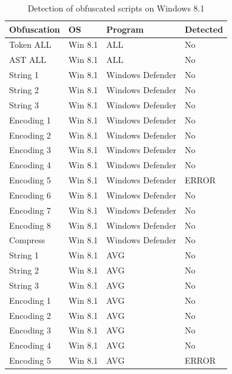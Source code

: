 \documentclass{article}%
\begin{document}
\begin{table}[]
\caption {Detection of obfuscated scripts on Windows 8.1} \label{tab:table_two}
\begin{center}
\begin{tabular}{|l|l|l|l|}
\hline
Obfuscation & OS      & Program          & Detected \\ \hline
Token ALL   & Win 8.1 & ALL              & No       \\ \hline
AST ALL     & Win 8.1 & ALL              & No       \\ \hline
String 1    & Win 8.1 & Windows Defender & No       \\ \hline
String 2    & Win 8.1 & Windows Defender & No       \\ \hline
String 3    & Win 8.1 & Windows Defender & No       \\ \hline
Encoding 1  & Win 8.1 & Windows Defender & No       \\ \hline
Encoding 2  & Win 8.1 & Windows Defender & No       \\ \hline
Encoding 3  & Win 8.1 & Windows Defender & No       \\ \hline
Encoding 4  & Win 8.1 & Windows Defender & No       \\ \hline
Encoding 5  & Win 8.1 & Windows Defender & ERROR    \\ \hline
Encoding 6  & Win 8.1 & Windows Defender & No       \\ \hline
Encoding 7  & Win 8.1 & Windows Defender & No       \\ \hline
Encoding 8  & Win 8.1 & Windows Defender & No       \\ \hline
Compress    & Win 8.1 & Windows Defender & No       \\ \hline
String 1    & Win 8.1 & AVG              & No       \\ \hline
String 2    & Win 8.1 & AVG              & No       \\ \hline
String 3    & Win 8.1 & AVG              & No       \\ \hline
Encoding 1  & Win 8.1 & AVG              & No       \\ \hline
Encoding 2  & Win 8.1 & AVG              & No       \\ \hline
Encoding 3  & Win 8.1 & AVG              & No       \\ \hline
Encoding 4  & Win 8.1 & AVG              & No       \\ \hline
Encoding 5  & Win 8.1 & AVG              & ERROR    \\ \hline

\end{tabular}
\end{center}
\end{table}
\end{document}
